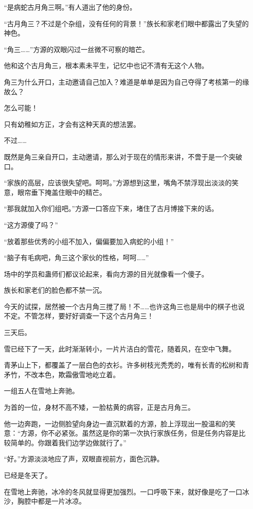 \begin{this_body}
“是病蛇古月角三啊。”有人道出了他的身份。

“古月角三？不过是个杂组，没有任何的背景！”族长和家老们眼中都露出了失望的神色。

“角三……”方源的双眼闪过一丝微不可察的暗芒。

他和这个古月角三，根本素未平生，记忆中也记不清有无这个人物。

角三为什么开口，主动邀请自己加入？难道是单单是因为自己夺得了考核第一的缘故么？

怎么可能！

只有幼稚如方正，才会有这种天真的想法罢。

不过……

既然是角三亲自开口，主动邀请，那么对于现在的情形来讲，不啻于是一个突破口。

“家族的高层，应该很失望吧。呵呵。”方源想到这里，嘴角不禁浮现出淡淡的笑意，眼帘垂下掩盖住眼中的精芒。

“那我就加入你们组吧。”方源一口答应下来，堵住了古月博接下来的话。

“这方源傻了吗？”

“放着那些优秀的小组不加入，偏偏要加入病蛇的小组！”

“脑子有毛病吧，角三这个家伙的性格，呵呵……”

场中的学员和蛊师们都议论起来，看向方源的目光就像看一个傻子。

族长和家老们的脸色都不禁一沉。

今天的试探，居然被一个古月角三搅了局！不……也许这角三也是局中的棋子也说不定。不管怎样，要好好调查一下这个古月角三！

三天后。

雪已经下了一天，此时渐渐转小，一片片洁白的雪花，随着风，在空中飞舞。

青茅山上下，都覆盖了一层白色的衣衫。许多树枝光秃秃的，唯有长青的松树和青矛竹，不改本色，欺霜傲雪地屹立着。

一组五人在雪地上奔驰。

为首的一位，身材不高不矮，一脸枯黄的病容，正是古月角三。

他一边奔跑，一边侧脸望向身边一直沉默着的方源，脸上浮现出一股温和的笑意：“方源，你不必紧张。虽然这是你的第一次执行家族任务，但是任务内容是比较简单的。你跟着我们边学边做就行了。”

“好。”方源淡淡地应了声，双眼直视前方，面色沉静。

已经是冬天了。

在雪地上奔驰，冰冷的冬风就显得更加强烈。一口呼吸下来，就好像是吃了一口冰沙，胸腔中都是一片冰凉。


\end{this_body}
